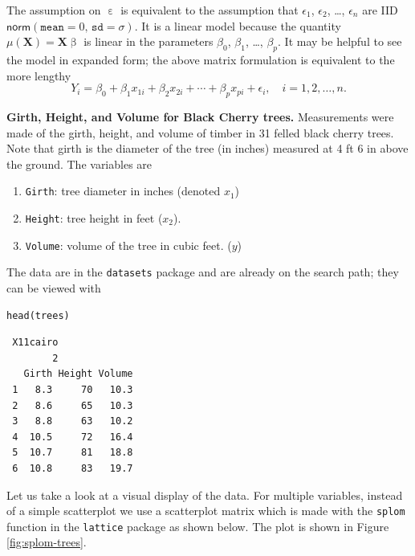 \documentclass[captions=tableheading]{scrbook}
\begin{document}
The assumption on \(\upepsilon\) is equivalent to the assumption that \(\epsilon_{1}\), \(\epsilon_{2}\), \ldots{}, \(\epsilon_{n}\) are IID \(\mathsf{norm}(\mathtt{mean}=0,\,\mathtt{sd}=\sigma)\). It is a linear model because the quantity \(\mu(\mathbf{X})=\mathbf{X}\upbeta\) is linear in the parameters \(\beta_{0}\), \(\beta_{1}\), \ldots{}, \(\beta_{p}\). It may be helpful to see the model in expanded form; the above matrix formulation is equivalent to the more lengthy
\begin{equation} 
Y_{i}=\beta_{0}+\beta_{1}x_{1i}+\beta_{2}x_{2i}+\cdots+\beta_{p}x_{pi}+\epsilon_{i},\quad i=1,2,\ldots,n.
\end{equation}

\begin{example}
\textbf{Girth, Height, and Volume for Black Cherry trees.} 
Measurements were made of the girth, height, and volume of timber in 31 felled black cherry trees. Note that girth is the diameter of the tree (in inches) measured at 4 ft 6 in above the ground. The variables are

\begin{enumerate}
\item \texttt{Girth}: tree diameter in inches (denoted \(x_{1}\))
\item \texttt{Height}: tree height in feet (\(x_{2}\)).
\item \texttt{Volume}: volume of the tree in cubic feet. (\(y\))
\end{enumerate}

The data are in the \texttt{datasets} package and are already on the search path; they can be viewed with


\begin{verbatim}
head(trees)
\end{verbatim}

\begin{verbatim}
 X11cairo 
        2
   Girth Height Volume
 1   8.3     70   10.3
 2   8.6     65   10.3
 3   8.8     63   10.2
 4  10.5     72   16.4
 5  10.7     81   18.8
 6  10.8     83   19.7
\end{verbatim}

Let us take a look at a visual display of the data. For multiple variables, instead of a simple scatterplot we use a scatterplot matrix which is made with the \texttt{splom} function in the \texttt{lattice} package \cite{Sarkarlattice} as shown below. The plot is shown in Figure \ref{fig:splom-trees}.



\end{example}
\end{document}
